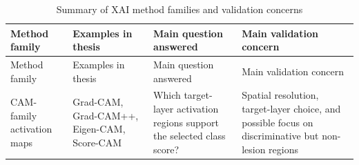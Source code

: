 \begin{longtable}[]{@{}llll@{}}
	\caption{Summary of XAI method families and validation
		concerns}\tabularnewline
	\toprule
	\begin{minipage}[b]{0.22\columnwidth}\raggedright
		Method family\strut
	\end{minipage} & \begin{minipage}[b]{0.22\columnwidth}\raggedright
		Examples in thesis\strut
	\end{minipage} & \begin{minipage}[b]{0.22\columnwidth}\raggedright
		Main question answered\strut
	\end{minipage} & \begin{minipage}[b]{0.22\columnwidth}\raggedright
		Main validation concern\strut
	\end{minipage}\tabularnewline
	\midrule
	\endfirsthead
	\toprule
	\begin{minipage}[b]{0.22\columnwidth}\raggedright
		Method family\strut
	\end{minipage} & \begin{minipage}[b]{0.22\columnwidth}\raggedright
		Examples in thesis\strut
	\end{minipage} & \begin{minipage}[b]{0.22\columnwidth}\raggedright
		Main question answered\strut
	\end{minipage} & \begin{minipage}[b]{0.22\columnwidth}\raggedright
		Main validation concern\strut
	\end{minipage}\tabularnewline
	\midrule
	\endhead
	\begin{minipage}[t]{0.22\columnwidth}\raggedright
		CAM-family activation maps\strut
	\end{minipage} & \begin{minipage}[t]{0.22\columnwidth}\raggedright
		Grad-CAM, Grad-CAM++, Eigen-CAM,
		Score-CAM\strut
	\end{minipage} & \begin{minipage}[t]{0.22\columnwidth}\raggedright
		Which target-layer activation regions support the selected class
		score?\strut
	\end{minipage} & \begin{minipage}[t]{0.22\columnwidth}\raggedright
		Spatial resolution, target-layer choice, and possible focus on
		discriminative but non-lesion regions
		

\end{minipage}
\end{longtable}
